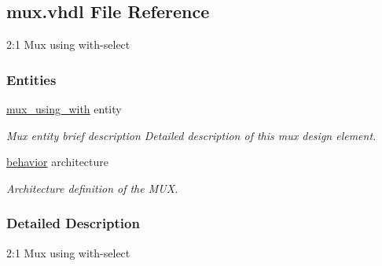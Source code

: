 \hypertarget{mux_8vhdl}{}\subsection{mux.\+vhdl File Reference}
\label{mux_8vhdl}


2\+:1 Mux using with-\/select  


\subsubsection*{Entities}
\begin{DoxyCompactItemize}
\item 
\hyperlink{classmux__using__with}{mux\+\_\+using\+\_\+with} entity
\begin{DoxyCompactList}\small\item\em Mux entity brief description Detailed description of this mux design element. \end{DoxyCompactList}\item 
\hyperlink{classmux__using__with_1_1behavior}{behavior} architecture
\begin{DoxyCompactList}\small\item\em Architecture definition of the M\+UX. \end{DoxyCompactList}\end{DoxyCompactItemize}


\subsubsection{Detailed Description}
2\+:1 Mux using with-\/select 

